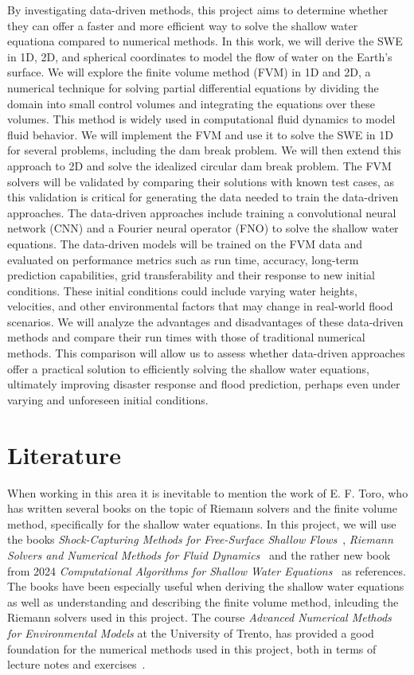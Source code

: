 By investigating data-driven methods, this project aims to determine whether they can offer a faster and more efficient way to solve the shallow water equationa compared to numerical methods.
In this work, we will derive the SWE in 1D, 2D, and spherical coordinates to model the flow of water on the Earth's surface.
We will explore the finite volume method (FVM) in 1D and 2D, a numerical technique for solving partial differential equations by dividing the domain into small control volumes and integrating the equations over these volumes.
This method is widely used in computational fluid dynamics to model fluid behavior.
We will implement the FVM and use it to solve the SWE in 1D for several problems, including the dam break problem. We will then extend this approach to 2D and solve the idealized circular dam break problem.
The FVM solvers will be validated by comparing their solutions with known test cases, as this validation is critical for generating the data needed to train the data-driven approaches.
The data-driven approaches include training a convolutional neural network (CNN) and a Fourier neural operator (FNO) to solve the shallow water equations.
The data-driven models will be trained on the FVM data and evaluated on performance metrics such as run time, accuracy, long-term prediction capabilities, grid transferability and their response to new initial conditions.
These initial conditions could include varying water heights, velocities, and other environmental factors that may change in real-world flood scenarios.
We will analyze the advantages and disadvantages of these data-driven methods and compare their run times with those of traditional numerical methods.
This comparison will allow us to assess whether data-driven approaches offer a practical solution to efficiently solving the shallow water equations, ultimately improving disaster response and flood prediction, perhaps even under varying and unforeseen initial conditions.

\section{Literature}
When working in this area it is inevitable to mention the work of E. F. Toro, who has written several books on the topic of Riemann solvers and the finite volume method, specifically for the shallow water equations.
In this project, we will use the books \textit{Shock-Capturing Methods for Free-Surface Shallow Flows}~\cite{Toro2001-Shock}, \textit{Riemann Solvers and Numerical Methods for Fluid Dynamics}~\cite{Toro2009-Riemann} and the rather new book from 2024 \textit{Computational Algorithms for Shallow Water Equations}~\cite{Toro2024} as references.
The books have been especially useful when deriving the shallow water equations as well as understanding and describing the finite volume method, inlcuding the Riemann solvers used in this project.
The course \textit{Advanced Numerical Methods for Environmental Models} at the University of Trento, has provided a good foundation for the numerical methods used in this project, both in terms of lecture notes and exercises~\cite{trento_course}.

